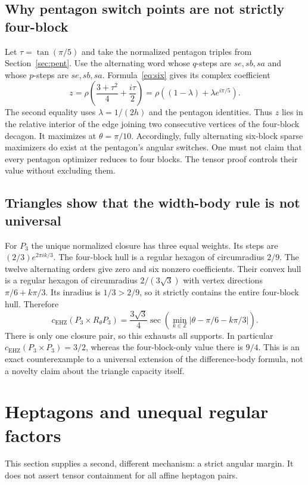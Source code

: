 \documentclass[11pt,a4paper]{article}
\theoremstyle{definition}\newtheorem{definition}[theorem]{Definition}
\theoremstyle{remark}\newtheorem{remark}[theorem]{Remark}
\newcommand{\capc}{c_{\mathrm{EHZ}}}
\begin{document}
\subsection{Why pentagon switch points are not strictly four-block}
Let $\tau=\tan(\pi/5)$ and take the normalized pentagon triples from Section~\ref{sec:pent}. Use the alternating word whose $q$-steps are $se,sb,sa$ and whose $p$-steps are $se,sb,sa$. Formula~\eqref{eq:six} gives its complex coefficient
\[
 z=\rho\left(\frac{3+\tau^2}{4}+\frac{i\tau}{2}\right)
   =\rho\left((1-\lambda)+\lambda e^{i\pi/5}\right).
\]
The second equality uses $\lambda=1/(2h)$ and the pentagon identities. Thus $z$ lies in the relative interior of the edge joining two consecutive vertices of the four-block decagon. It maximizes at $\theta=\pi/10$. Accordingly, fully alternating six-block sparse maximizers do exist at the pentagon's angular switches. One must not claim that every pentagon optimizer reduces to four blocks. The tensor proof controls their value without excluding them.

\subsection{Triangles show that the width-body rule is not universal}
For $P_3$ the unique normalized closure has three equal weights. Its steps are $(2/3)e^{2\pi i k/3}$. The four-block hull is a regular hexagon of circumradius $2/9$. The twelve alternating orders give zero and six nonzero coefficients. Their convex hull is a regular hexagon of circumradius $2/(3\sqrt3)$ with vertex directions $\pi/6+k\pi/3$. Its inradius is $1/3>2/9$, so it strictly contains the entire four-block hull. Therefore
\begin{equation}\label{eq:triangle}
 \boxed{\displaystyle
 \capc(P_3\times R_\theta P_3)
 =\frac{3\sqrt3}{4}\sec\left(\min_{k\in\mathbb Z}|\theta-\pi/6-k\pi/3|\right).}
\end{equation}
There is only one closure pair, so this exhausts all supports. In particular $\capc(P_3\times P_3)=3/2$, whereas the four-block-only value there is $9/4$. This is an exact counterexample to a universal extension of the difference-body formula, not a novelty claim about the triangle capacity itself.

\section{Heptagons and unequal regular factors}\label{sec:hept}
This section supplies a second, different mechanism: a strict angular margin. It does not assert tensor containment for all affine heptagon pairs.
\end{document}
